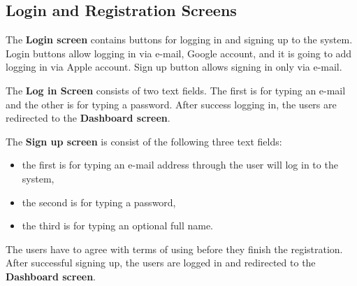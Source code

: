 \subsection{Login and Registration Screens}\label{subsec:login-screen}
The \textbf{Login screen} contains buttons for logging in and signing up to the system.
Login buttons allow logging in via e-mail, Google account, and it is going to add logging in via Apple account.
Sign up button allows signing in only via e-mail.

The \textbf{Log in Screen} consists of two text fields.
The first is for typing an e-mail and the other is for typing a password.
After success logging in, the users are redirected to the \textbf{Dashboard screen}.

The \textbf{Sign up screen} is consist of the following three text fields:
\begin{itemize}
    \item the first is for typing an e-mail address through the user will log in to the system,
    \item the second is for typing a password,
    \item the third is for typing an optional full name.
\end{itemize}
The users have to agree with terms of using before they finish the registration.
After successful signing up, the users are logged in and redirected to the \textbf{Dashboard screen}.
